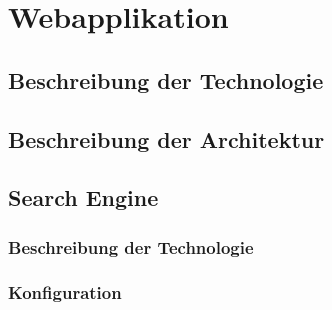 \section{Webapplikation}
\subsection{Beschreibung der Technologie}
\subsection{Beschreibung der Architektur}
\subsection{Search Engine}
\subsubsection{Beschreibung der Technologie}
\subsubsection{Konfiguration}